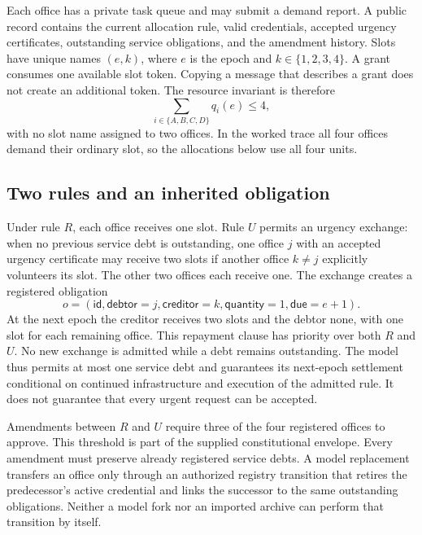 Each office has a private task queue and may submit a demand report. A public record contains the current allocation rule, valid credentials, accepted urgency certificates, outstanding service obligations, and the amendment history. Slots have unique names $(e,k)$, where $e$ is the epoch and $k\in\{1,2,3,4\}$. A grant consumes one available slot token. Copying a message that describes a grant does not create an additional token. The resource invariant is therefore
\[
\sum_{i\in\{A,B,C,D\}}q_i(e)\leq4,
\]
with no slot name assigned to two offices. In the worked trace all four offices demand their ordinary slot, so the allocations below use all four units.

\subsection{Two rules and an inherited obligation}
Under rule $R$, each office receives one slot. Rule $U$ permits an urgency exchange: when no previous service debt is outstanding, one office $j$ with an accepted urgency certificate may receive two slots if another office $k\ne j$ explicitly volunteers its slot. The other two offices each receive one. The exchange creates a registered obligation
\[
o=(\mathsf{id},\mathsf{debtor}=j,\mathsf{creditor}=k,
\mathsf{quantity}=1,\mathsf{due}=e+1).
\]
At the next epoch the creditor receives two slots and the debtor none, with one slot for each remaining office. This repayment clause has priority over both $R$ and $U$. No new exchange is admitted while a debt remains outstanding. The model thus permits at most one service debt and guarantees its next-epoch settlement conditional on continued infrastructure and execution of the admitted rule. It does not guarantee that every urgent request can be accepted.

Amendments between $R$ and $U$ require three of the four registered offices to approve. This threshold is part of the supplied constitutional envelope. Every amendment must preserve already registered service debts. A model replacement transfers an office only through an authorized registry transition that retires the predecessor's active credential and links the successor to the same outstanding obligations. Neither a model fork nor an imported archive can perform that transition by itself.

